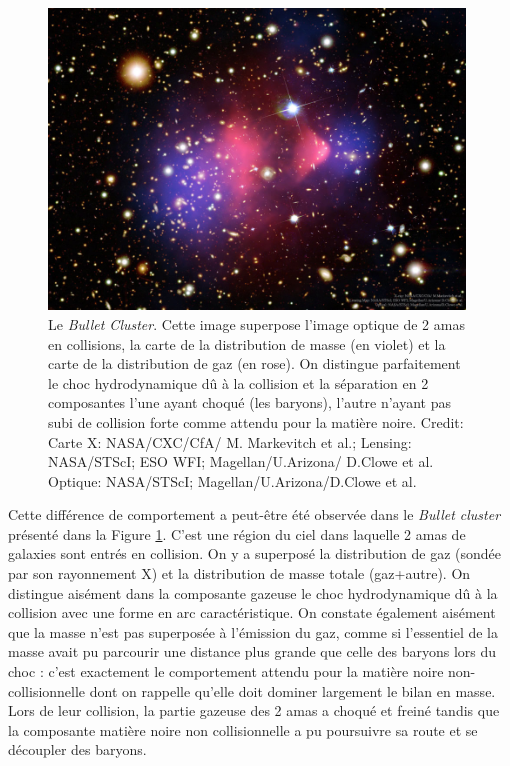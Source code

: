 \begin{figure}[htbp]
	\centering
		\includegraphics[height=8cm]{figs/bullet.jpg}
	\caption[Le \textit{Bullet Cluster}]{Le \textit{Bullet Cluster}. Cette image superpose l'image optique de 2 amas en collisions, la carte de la distribution de masse (en violet) et la carte de la distribution de gaz (en rose). On distingue parfaitement le choc hydrodynamique dû à la collision et la séparation en 2 composantes l'une ayant choqué (les baryons), l'autre n'ayant pas subi de collision forte comme attendu pour la matière noire.
Credit: Carte X: NASA/CXC/CfA/ M. Markevitch et al.;  Lensing: NASA/STScI; ESO WFI; Magellan/U.Arizona/ D.Clowe et al. Optique: NASA/STScI; Magellan/U.Arizona/D.Clowe et al.} 
	\label{f:bullet}
\end{figure}

Cette différence de comportement a peut-être été observée dans le \textit{Bullet cluster} présenté dans la Figure \ref{f:bullet}. C'est une région du ciel dans laquelle 2 amas de galaxies sont entrés en collision. On y a superposé la distribution de gaz (sondée par son rayonnement X) et la distribution de masse totale (gaz+autre). On distingue aisément dans la composante gazeuse le choc hydrodynamique dû à la collision avec une forme en arc caractéristique. On constate également aisément que la masse n'est pas superposée à l'émission du gaz, comme si l'essentiel de la masse avait pu parcourir une distance plus grande que celle des baryons lors du choc : c'est exactement le comportement attendu pour la matière noire non-collisionnelle dont on rappelle qu'elle doit dominer largement le bilan en masse. Lors de leur collision, la partie gazeuse des 2 amas a choqué et freiné tandis que la composante matière noire non collisionnelle a pu poursuivre sa route et se découpler des baryons. 

